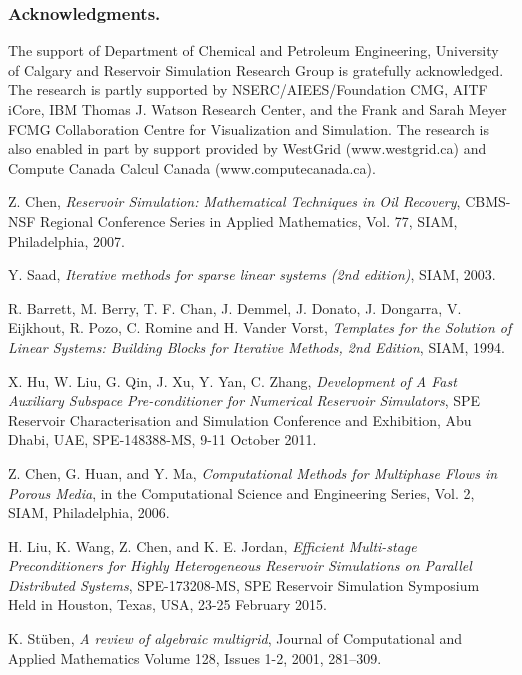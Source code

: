 \documentclass[runningheads,a4paper]{llncs}
\begin{document}
{\subsubsection*{Acknowledgments.}
The support of Department of Chemical and Petroleum Engineering, University of Calgary and Reservoir Simulation Research Group is gratefully acknowledged. The research is partly supported by NSERC/AIEES/Foundation CMG, AITF iCore, IBM Thomas J. Watson Research Center, and the Frank and Sarah Meyer FCMG Collaboration Centre for Visualization and Simulation. The research is also enabled in part by support provided by WestGrid (www.westgrid.ca) and Compute Canada Calcul Canada (www.computecanada.ca).

\begin{thebibliography}{4}

 Z. Chen,
\emph{Reservoir Simulation: Mathematical Techniques in Oil Recovery},
CBMS-NSF Regional Conference Series in Applied Mathematics, Vol. 77, SIAM, Philadelphia, 2007.


 Y. Saad,
\emph{Iterative methods for sparse linear systems (2nd edition)},
SIAM, 2003.

 R. Barrett, M. Berry, T. F. Chan, J. Demmel, J. Donato, J. Dongarra, V. Eijkhout, R. Pozo, C. Romine and H. Vander Vorst,
\emph{Templates for the Solution of Linear Systems: Building Blocks for Iterative Methods, 2nd Edition},
SIAM, 1994.

 X. Hu, W. Liu, G. Qin, J. Xu, Y. Yan, C. Zhang,
\emph{Development of A Fast Auxiliary Subspace Pre-conditioner for Numerical Reservoir Simulators},
SPE Reservoir Characterisation and Simulation Conference and Exhibition, Abu Dhabi, UAE, SPE-148388-MS, 9-11 October 2011.

 Z. Chen, G. Huan, and Y. Ma,
\emph{Computational Methods for Multiphase Flows in Porous Media},
in the Computational Science and Engineering Series, Vol. 2, SIAM, Philadelphia, 2006.

 H. Liu, K. Wang, Z. Chen, and K. E. Jordan,
\emph{Efficient Multi-stage Preconditioners for Highly Heterogeneous Reservoir Simulations on Parallel Distributed Systems},
SPE-173208-MS, SPE Reservoir Simulation Symposium Held in Houston, Texas, USA, 23-25 February 2015.

{K. St\"{u}ben},
\emph{A review of algebraic multigrid}, Journal of Computational and Applied Mathematics
Volume 128, Issues 1-2, 2001, 281--309.


\end{thebibliography}}
\end{document}
